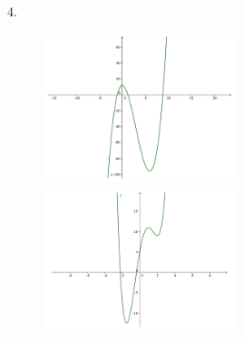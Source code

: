 \documentclass{article}
\begin{document}
\noindent{}4. 
\begin{figure}[!h]
	\includegraphics[width=0.5\textwidth]{a.pdf}
	\includegraphics[width=0.5\textwidth]{b.pdf}
\end{figure}
\newpage{}
\end{document}
